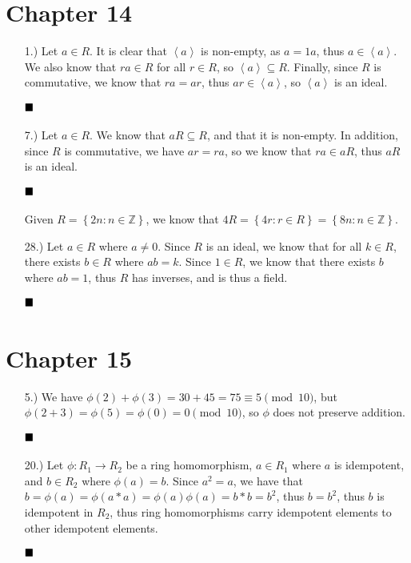 \documentclass[11pt]{article}
\newcommand{\done}{
    \ensuremath{\strut\hfill\blacksquare}
}
\newcommand{\angleb}[1]{\left\langle#1\right\rangle} %
\newcommand{\braces}[1]{\left\{#1\right\}}           %
\newcommand{\Z}{\mathbb{Z}}
\begin{document}
\pagestyle{fancy}
\fancyhead{}

\normalsize

\section*{Chapter 14}

\begin{itemize}
    \item [1.)] Let $a \in R$. It is clear that $\angleb{a}$ is non-empty, as
    $a=1a$, thus $a \in \angleb{a}$.
    We also know that $ra \in R$ for all $r \in R$, so
    $\angleb{a} \subseteq R$.
    Finally, since $R$ is commutative, we know that $ra=ar$, thus
    $ar \in \angleb{a}$, so $\angleb{a}$ is an ideal.
    \done

    \item [7.)] Let $a \in R$. We know that $aR \subseteq R$, and that it is
    non-empty.
    In addition, since $R$ is commutative, we have $ar=ra$, so we know that
    $ra \in aR$, thus $aR$ is an ideal.
    \done

    Given $R = \braces{2n:n \in \Z}$, we know that
    $4R=\braces{4r:r \in R}=\braces{8n:n \in \Z}$.

    \item [28.)] Let $a\in R$ where $a\ne0$.
    Since $R$ is an ideal, we know that for all $k\in R$, there exists
    $b\in R$ where $ab=k$.
    Since $1\in R$, we know that there exists $b$ where $ab=1$, thus $R$ has
    inverses, and is thus a field.
    \done
\end{itemize}

\section*{Chapter 15}

\begin{itemize}
    \item [5.)] We have $\phi(2)+\phi(3)=30+45=75\equiv5\pmod{10}$, but
    $\phi(2+3)=\phi(5)=\phi(0)=0\pmod{10}$, so $\phi$ does not preserve
    addition.
    \done

    \item [20.)] Let $\phi:R_1 \to R_2$ be a ring homomorphism, $a\in R_1$
    where $a$ is idempotent, and $b\in R_2$ where $\phi(a)=b$.
    Since $a^2=a$, we have that
    $b=\phi(a)=\phi(a*a)=\phi(a)\phi(a)=b*b=b^2$, thus $b=b^2$, thus $b$
    is idempotent in $R_2$, thus ring homomorphisms carry idempotent elements
    to other idempotent elements.
    \done
    
\end{itemize}
\end{document}
